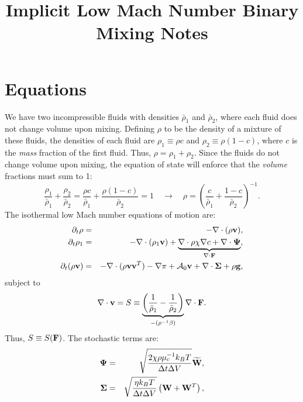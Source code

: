 \documentclass[final]{siamltex}
\def\Fb {{\bf F}}
\def\gb {{\bf g}}
\def\vb {{\bf v}}
\def\Wb {{\bf W}}
\def\Psib   {\boldsymbol{\Psi}}
\def\Sigmab {\boldsymbol{\Sigma}}
\begin{document}
\title{Implicit Low Mach Number Binary Mixing Notes}

\maketitle

\section{Equations}
We have two incompressible fluids with densities $\bar\rho_1$ and $\bar\rho_2$, where 
each fluid does not change volume upon mixing.  Defining $\rho$ to be the density of
a mixture of these fluids, the densities of each fluid are $\rho_1 \equiv \rho c$ and 
$\rho_2 \equiv \rho(1-c)$, where $c$ is the {\it mass} fraction of the first fluid.  
Thus, $\rho = \rho_1 + \rho_2$.  Since the fluids do not change volume upon mixing, 
the equation of state will enforce that the {\it volume} fractions must sum to 1:
\begin{equation}
\frac{\rho_1}{\bar\rho_1} + \frac{\rho_2}{\bar\rho_2} =
\frac{\rho c}{\bar\rho_1} + \frac{\rho(1-c)}{\bar\rho_2} = 1 
\quad \rightarrow \quad
\rho = \left(\frac{c}{\bar\rho_1} + \frac{1-c}{\bar\rho_2}\right)^{-1}.
\end{equation}
The isothermal low Mach number equations of motion are:
\begin{eqnarray}
\partial_t\rho &=& -\nabla\cdot(\rho\vb),\\
\partial_t\rho_1 &=& -\nabla\cdot(\rho_1\vb) + \underbrace{\nabla\cdot\rho\chi\nabla c + \nabla\cdot\Psib}_{\nabla\cdot\Fb},\\
\partial_t(\rho\vb) &=& -\nabla\cdot(\rho\vb\vb^T) - \nabla\pi + \mathcal{A}_0\vb + \nabla\cdot\Sigmab + \rho\gb,
\end{eqnarray}
subject to
\begin{equation}
\nabla\cdot\vb = S \equiv \underbrace{\left(\frac{1}{\bar\rho_1}-\frac{1}{\bar\rho_2}\right)}_{-(\rho^{-1}\beta)}\nabla\cdot\Fb.
\end{equation}
Thus, $S \equiv S(\Fb)$.  The stochastic terms are:
\begin{eqnarray}
\Psib &=& \sqrt{\frac{2\chi\rho\mu_c^{-1}k_BT}{\Delta t\Delta V}}\widetilde\Wb,\label{eq:rho1 stoch}\\
\Sigmab &=& \sqrt{\frac{\eta k_B T}{\Delta t\Delta V}}\left(\Wb + \Wb^T\right),\label{eq:mom stoch}
\end{eqnarray}
\end{document}
